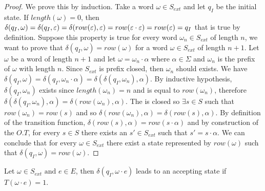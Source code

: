 \begin{proof}
  We prove this by induction.
  Take a word $\omega \in S_{ext}$ and let $q_I$ be the initial state.
  If $length(\omega) = 0$, then $\delta(q_I, \omega) = \delta(q_I, \varepsilon) = \delta(row(\varepsilon), \varepsilon) =  row(\varepsilon \cdot \varepsilon) = row(\varepsilon) = q_I$ that is true by definition.
  Suppose this property is true for every word $\omega_n \in S_{ext}$ of length $n$, we want to prove that $\delta(q_I, \omega) = row(\omega)$ for a word $\omega \in S_{ext}$ of length $n+1$.
  Let $\omega$ be a word of length $n+1$ and let $\omega = \omega_n \cdot \alpha$ where $\alpha \in \Sigma$ and $\omega_n$ is the prefix of $\omega$ with length $n$. Since $S_{ext}$ is prefix closed, then $\omega_n$ should exists.
  We have $\delta(q_I, \omega) = \delta(q_I, \omega_n \cdot \alpha) = \delta(\delta(q_I, \omega_n), \alpha)$. By inductive hypothesis, $\delta(q_I, \omega_n)$ exists since $length(\omega_n) = n$ and is equal to $row(\omega_n)$, therefore $\delta(\delta(q_I, \omega_n), \alpha) = \delta(row(\omega_n), \alpha)$.
  The \OT is closed so $\exists s \in S$ such that $row(\omega_n) = row(s)$ and so $\delta(row(\omega_n), \alpha) = \delta(row(s), \alpha)$.
  By definition of the transition function, $\delta(row(s), \alpha) = row(s \cdot \alpha)$ and by construction of the $O.T$, for every $s \in S$ there exists an $s' \in S_{ext}$ such that $s' = s \cdot \alpha$.
  We can conclude that for every $\omega \in S_{ext}$ there exist a state represented by $row(\omega)$ such that $\delta(q_I, \omega) = row(\omega)$.
\end{proof}

\begin{lemma}
  \label{lemma:L_acceptance}
  Let $\omega \in S_{ext} \text{ and } e \in E$, then $\delta(q_I, \omega \cdot e)$ leads to an accepting state if $T(\omega \cdot e) = 1$.
\end{lemma}

